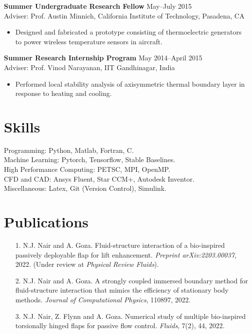 \documentclass[margin]{res}
\begin{document}
\begin{resume}
{\bf Summer Undergraduate Research Fellow} \hfill May--July 2015\\
Adviser: Prof. Austin Minnich, California Institute of Technology, Pasadena, CA
\begin{itemize}
	\item Designed and fabricated a prototype consisting of thermoelectric generators to
	power wireless temperature sensors in aircraft.
\end{itemize}

{\bf Summer Research Internship Program} \hfill   May 2014--April 2015\\
Adviser: Prof. Vinod Narayanan, IIT Gandhinagar, India
\begin{itemize}
	\item Performed local stability analysis of axisymmetric thermal boundary layer in response to heating and cooling.
\end{itemize}


\section{\large Skills}		 
Programming: Python, Matlab, Fortran, C.\\
Machine Learning: Pytorch, Tensorflow, Stable Baselines.\\
High Performance Computing: PETSC, MPI, OpenMP.\\
CFD and CAD: Ansys Fluent, Star CCM+, Autodesk Inventor.\\ 
Miscellaneous: Latex, Git (Version Control), Simulink.

\section{\large Publications}
 \begin{itemize}
 
  	\item[1.] N.J. Nair and A. Goza. Fluid-structure interaction of a bio-inspired passively deployable flap for lift enhancement. \textit{Preprint arXiv:2203.00037}, 2022. (Under review at \textit{Physical Review Fluids}).

	\item[2.] N.J. Nair and A. Goza. A strongly coupled immersed boundary method for fluid-structure interaction that mimics the efficiency of stationary body methods. \textit{Journal of Computational Physics},  110897, 2022.
	
	\item[3.] N.J. Nair, Z. Flynn and A. Goza. Numerical study of multiple bio-inspired torsionally hinged flaps for passive flow control. \textit{Fluids}, 7(2), 44, 2022.
	

\end{itemize}
\end{resume}
\end{document}
